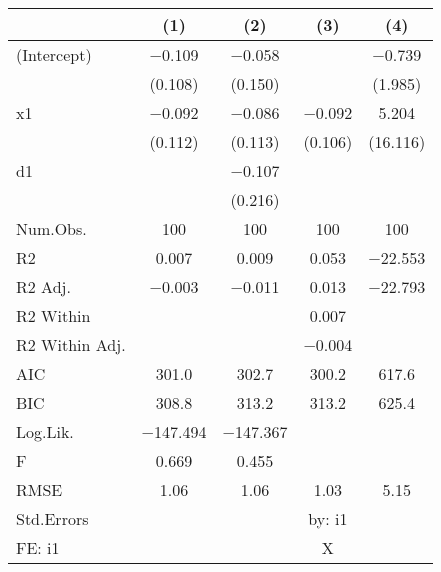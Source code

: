 \begin{table}[H]
\centering
\begin{tabular}[t]{lcccc}
\toprule
  & (1) & (2) & (3) & (4)\\
\midrule
(Intercept) & \num{-0.109} & \num{-0.058} &  & \num{-0.739}\\
 & (\num{0.108}) & (\num{0.150}) &  & (\num{1.985})\\
x1 & \num{-0.092} & \num{-0.086} & \num{-0.092} & \num{5.204}\\
 & (\num{0.112}) & (\num{0.113}) & (\num{0.106}) & (\num{16.116})\\
d1 &  & \num{-0.107} &  & \\
 &  & (\num{0.216}) &  & \\
\midrule
Num.Obs. & \num{100} & \num{100} & \num{100} & \num{100}\\
R2 & \num{0.007} & \num{0.009} & \num{0.053} & \num{-22.553}\\
R2 Adj. & \num{-0.003} & \num{-0.011} & \num{0.013} & \num{-22.793}\\
R2 Within &  &  & \num{0.007} & \\
R2 Within Adj. &  &  & \num{-0.004} & \\
AIC & \num{301.0} & \num{302.7} & \num{300.2} & \num{617.6}\\
BIC & \num{308.8} & \num{313.2} & \num{313.2} & \num{625.4}\\
Log.Lik. & \num{-147.494} & \num{-147.367} &  & \\
F & \num{0.669} & \num{0.455} &  & \\
RMSE & \num{1.06} & \num{1.06} & \num{1.03} & \num{5.15}\\
Std.Errors &  &  & by: i1 & \\
FE: i1 &  &  & X & \\
\bottomrule
\end{tabular}
\end{table}
